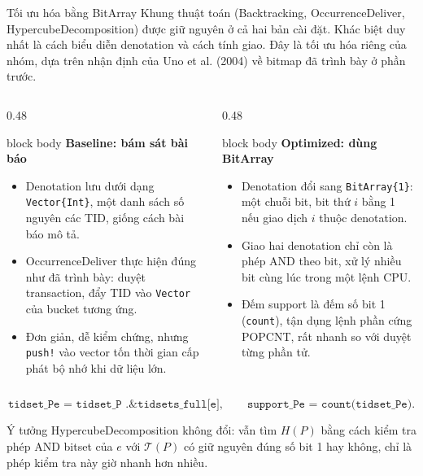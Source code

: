\documentclass[9pt, aspectratio=169]{beamer}
\newenvironment{quietblock}[1]{%
  \begin{beamercolorbox}[wd=\linewidth,sep=5pt,rounded=true]{block body}
  {\color{psdearblue}\bfseries #1}\par\vspace{2pt}\footnotesize
}{%
  \end{beamercolorbox}
}
\begin{document}
\begin{frame}{Tối ưu hóa bằng BitArray}
  \small
  Khung thuật toán (Backtracking, OccurrenceDeliver, HypercubeDecomposition)
  được giữ nguyên ở cả hai bản cài đặt. Khác biệt duy nhất là cách biểu
  diễn denotation và cách tính giao. Đây là tối ưu hóa riêng của nhóm, dựa
  trên nhận định của Uno et al. (2004) về bitmap đã trình bày ở phần trước.

  \begin{columns}[T,onlytextwidth]
    \begin{column}{0.48\textwidth}
      \begin{quietblock}{Baseline: bám sát bài báo}
        \begin{itemize}
          \item Denotation lưu dưới dạng \texttt{Vector\{Int\}}, một danh
            sách số nguyên các TID, giống cách bài báo mô tả.
          \item OccurrenceDeliver thực hiện đúng như đã trình bày: duyệt
            transaction, đẩy TID vào \texttt{Vector} của bucket tương ứng.
          \item Đơn giản, dễ kiểm chứng, nhưng \texttt{push!} vào vector
            tốn thời gian cấp phát bộ nhớ khi dữ liệu lớn.
        \end{itemize}
      \end{quietblock}
    \end{column}

    \begin{column}{0.48\textwidth}
      \begin{quietblock}{Optimized: dùng BitArray}
        \begin{itemize}
          \item Denotation đổi sang \texttt{BitArray\{1\}}: một chuỗi bit,
            bit thứ $i$ bằng 1 nếu giao dịch $i$ thuộc denotation.
          \item Giao hai denotation chỉ còn là phép AND theo bit, xử lý
            nhiều bit cùng lúc trong một lệnh CPU.
          \item Đếm support là đếm số bit 1 (\texttt{count}), tận dụng lệnh
            phần cứng POPCNT, rất nhanh so với duyệt từng phần tử.
        \end{itemize}
      \end{quietblock}
    \end{column}
  \end{columns}

  \vspace{0.3cm}
  \centering
  \[
    \texttt{tidset\_Pe = tidset\_P .\& tidsets\_full[e]},
    \qquad
    \texttt{support\_Pe = count(tidset\_Pe)}.
  \]
  \small
  \raggedright
  Ý tưởng HypercubeDecomposition không đổi: vẫn tìm $H(P)$ bằng cách kiểm
  tra phép AND bitset của $e$ với $\mathcal T(P)$ có giữ nguyên đúng số bit
  1 hay không, chỉ là phép kiểm tra này giờ nhanh hơn nhiều.
\end{frame}
\end{document}
